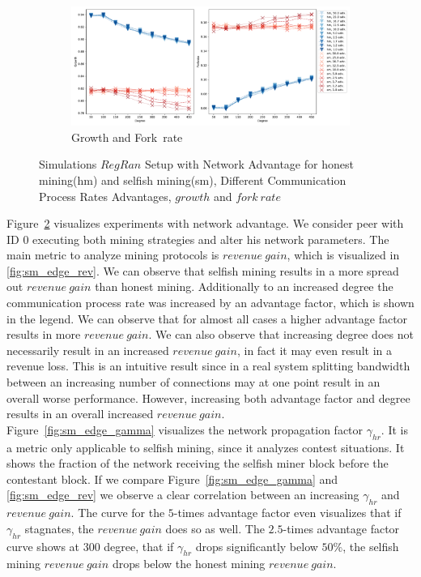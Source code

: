 \begin{figure}[tbp]
\begin{subfigure}[b]{\textwidth}
		\includegraphics[width=\textwidth]{figures/sm_edge_new_growth_and_forkrate.pdf}
		\caption{Growth and Fork~rate}
		\label{fig:growth_fork}
	\end{subfigure}
\caption{Simulations $RegRan$ Setup with Network Advantage for honest mining(hm) and selfish mining(sm), Different Communication Process Rates Advantages, $growth$ and $fork~rate$}
\label{fig:sm_edge_new}
\end{figure}
Figure~\ref{fig:sm_edge_new} visualizes experiments with network advantage. We consider peer with ID $0$ executing both mining strategies and alter his network parameters. The main metric to analyze mining protocols is $revenue~gain$, which is visualized in \ref{fig:sm_edge_rev}. We can observe that selfish mining results in a more spread out $revenue~gain$ than honest mining. Additionally to an increased degree the communication process rate was increased by an advantage factor, which is shown in the legend. We can observe that for almost all cases a higher advantage factor results in more $revenue~gain$. We can also observe that increasing degree does not necessarily result in an increased $revenue~gain$, in fact it may even result in a revenue loss. This is an intuitive result since in a real system splitting bandwidth between an increasing number of connections may at one point result in an overall worse performance. However, increasing both advantage factor and degree results in an overall increased $revenue~gain$.\\
Figure~\ref{fig:sm_edge_gamma} visualizes the network propagation factor $\gamma_{hr}$. It is a metric only applicable to selfish mining, since it analyzes contest situations. It shows the fraction of the network receiving the selfish miner block before the contestant block. If we compare Figure~\ref{fig:sm_edge_gamma} and \ref{fig:sm_edge_rev} we observe a clear correlation between an increasing $\gamma_{hr}$ and $revenue~gain$. The curve for the $5$-times advantage factor even visualizes that if $\gamma_{hr}$ stagnates, the $revenue~gain$ does so as well. The $2.5$-times advantage factor curve shows at $300$ degree, that if $\gamma_{hr}$ drops significantly below $50\% $, the selfish mining $revenue~gain$ drops below the honest mining $revenue~gain$.\\
